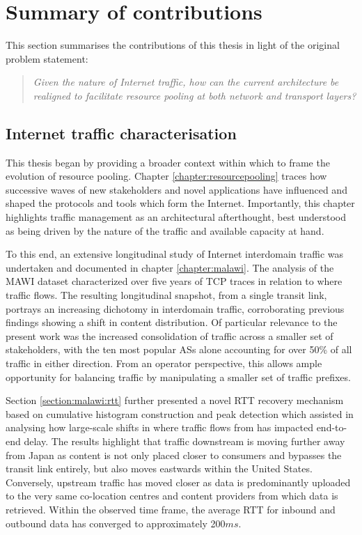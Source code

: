 \section{Summary of contributions}

This section summarises the contributions of this thesis in light of the original problem statement:

\begin{quote}
\textit{
Given the nature of Internet traffic, how can the current architecture be realigned to facilitate resource pooling at both network and transport layers?
}
\end{quote}

\subsection{Internet traffic characterisation}

This thesis began by providing a broader context within which to frame the evolution of resource pooling.
Chapter \ref{chapter:resourcepooling} traces how successive waves of new stakeholders and novel applications have influenced and shaped the protocols and tools which form the Internet.
Importantly, this chapter highlights traffic management as an architectural afterthought, best understood as being driven by the nature of the traffic and available capacity at hand.

To this end, an extensive longitudinal study of Internet interdomain traffic was undertaken and documented in chapter \ref{chapter:malawi}.
The analysis of the \ac{MAWI} dataset characterized over five years of TCP traces in relation to where traffic flows. 
The resulting longitudinal snapshot, from a single transit link, portrays an increasing dichotomy in interdomain traffic, corroborating previous findings \cite{Labovitz:2010p175} showing a shift in content distribution.
Of particular relevance to the present work was the increased consolidation of traffic across a smaller set of stakeholders, with the ten most popular \acp{AS} alone accounting for over 50\% of all traffic in either direction.
From an operator perspective, this allows ample opportunity for balancing traffic by manipulating a smaller set of traffic prefixes.

Section \ref{section:malawi:rtt} further presented a novel \ac{RTT} recovery mechanism based on cumulative histogram construction and peak detection which assisted in analysing how large-scale shifts in where traffic flows from has impacted end-to-end delay.
The results highlight that traffic downstream is moving further away from Japan as content is not only placed closer to consumers and bypasses the transit link entirely, but also moves eastwards within the United States.
Conversely, upstream traffic has moved closer as data is predominantly uploaded to the very same co-location centres and content providers from which data is retrieved.
Within the observed time frame, the average \ac{RTT} for inbound and outbound data has converged to approximately 200$ms$.

